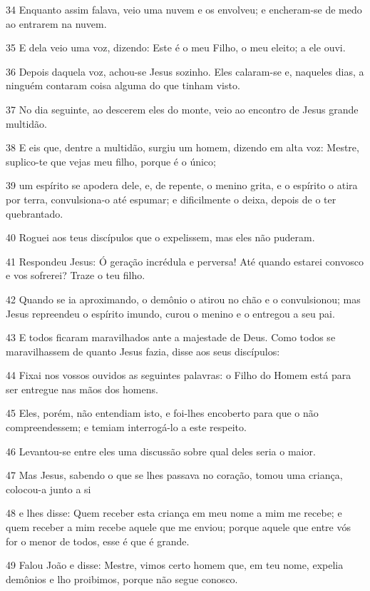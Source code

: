 \par 34 Enquanto assim falava, veio uma nuvem e os envolveu; e encheram-se de medo ao entrarem na nuvem.
\par 35 E dela veio uma voz, dizendo: Este é o meu Filho, o meu eleito; a ele ouvi.
\par 36 Depois daquela voz, achou-se Jesus sozinho. Eles calaram-se e, naqueles dias, a ninguém contaram coisa alguma do que tinham visto.
\par 37 No dia seguinte, ao descerem eles do monte, veio ao encontro de Jesus grande multidão.
\par 38 E eis que, dentre a multidão, surgiu um homem, dizendo em alta voz: Mestre, suplico-te que vejas meu filho, porque é o único;
\par 39 um espírito se apodera dele, e, de repente, o menino grita, e o espírito o atira por terra, convulsiona-o até espumar; e dificilmente o deixa, depois de o ter quebrantado.
\par 40 Roguei aos teus discípulos que o expelissem, mas eles não puderam.
\par 41 Respondeu Jesus: Ó geração incrédula e perversa! Até quando estarei convosco e vos sofrerei? Traze o teu filho.
\par 42 Quando se ia aproximando, o demônio o atirou no chão e o convulsionou; mas Jesus repreendeu o espírito imundo, curou o menino e o entregou a seu pai.
\par 43 E todos ficaram maravilhados ante a majestade de Deus. Como todos se maravilhassem de quanto Jesus fazia, disse aos seus discípulos:
\par 44 Fixai nos vossos ouvidos as seguintes palavras: o Filho do Homem está para ser entregue nas mãos dos homens.
\par 45 Eles, porém, não entendiam isto, e foi-lhes encoberto para que o não compreendessem; e temiam interrogá-lo a este respeito.
\par 46 Levantou-se entre eles uma discussão sobre qual deles seria o maior.
\par 47 Mas Jesus, sabendo o que se lhes passava no coração, tomou uma criança, colocou-a junto a si
\par 48 e lhes disse: Quem receber esta criança em meu nome a mim me recebe; e quem receber a mim recebe aquele que me enviou; porque aquele que entre vós for o menor de todos, esse é que é grande.
\par 49 Falou João e disse: Mestre, vimos certo homem que, em teu nome, expelia demônios e lho proibimos, porque não segue conosco.
